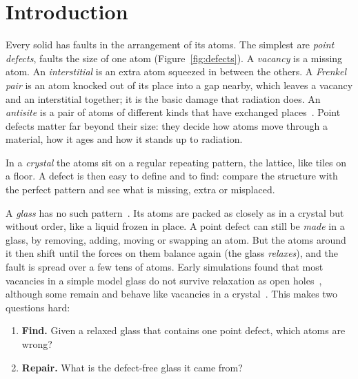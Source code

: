 \documentclass[10pt]{article}
\begin{document}
\section{Introduction}

Every solid has faults in the arrangement of its atoms. The simplest are \emph{point defects}, faults the size of one atom (Figure~\ref{fig:defects}). A \emph{vacancy} is a missing atom. An \emph{interstitial} is an extra atom squeezed in between the others. A \emph{Frenkel pair} is an atom knocked out of its place into a gap nearby, which leaves a vacancy and an interstitial together; it is the basic damage that radiation does. An \emph{antisite} is a pair of atoms of different kinds that have exchanged places~\citep{kittel2005,was2017}. Point defects matter far beyond their size: they decide how atoms move through a material, how it ages and how it stands up to radiation.

In a \emph{crystal} the atoms sit on a regular repeating pattern, the lattice, like tiles on a floor. A defect is then easy to define and to find: compare the structure with the perfect pattern and see what is missing, extra or misplaced.

A \emph{glass} has no such pattern~\citep{zachariasen1932}. Its atoms are packed as closely as in a crystal but without order, like a liquid frozen in place. A point defect can still be \emph{made} in a glass, by removing, adding, moving or swapping an atom. But the atoms around it then shift until the forces on them balance again (the glass \emph{relaxes}), and the fault is spread over a few tens of atoms. Early simulations found that most vacancies in a simple model glass do not survive relaxation as open holes~\citep{bennett1979}, although some remain and behave like vacancies in a crystal~\citep{delaye1993}. This makes two questions hard:
\begin{enumerate}
\item \textbf{Find.} Given a relaxed glass that contains one point defect, which atoms are wrong?
\item \textbf{Repair.} What is the defect-free glass it came from?
\end{enumerate}
\end{document}
